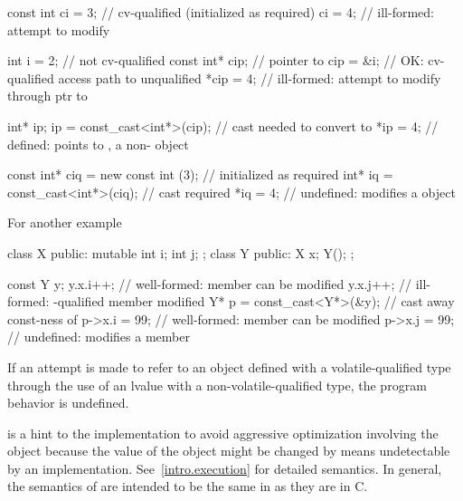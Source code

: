 \pnum
\enterexample

\begin{codeblock}
const int ci = 3;               // cv-qualified (initialized as required)
ci = 4;                         // ill-formed: attempt to modify 

int i = 2;                      // not cv-qualified
const int* cip;                 // pointer to 
cip = &i;                       // OK: cv-qualified access path to unqualified
*cip = 4;                       // ill-formed: attempt to modify through ptr to 

int* ip;
ip = const_cast<int*>(cip);     // cast needed to convert  to 
*ip = 4;                        // defined:  points to , a non- object

const int* ciq = new const int (3);     // initialized as required
int* iq = const_cast<int*>(ciq);        // cast required
*iq = 4;                                // undefined: modifies a  object
\end{codeblock}

\pnum
For another example

\begin{codeblock}
class X {
    public:
	mutable int i;
	int j;
};
class Y {
    public:
	X x;
	Y();
};

const Y y;
y.x.i++;                        // well-formed:  member can be modified
y.x.j++;                        // ill-formed: -qualified member modified
Y* p = const_cast<Y*>(&y);      // cast away const-ness of 
p->x.i = 99;                    // well-formed:  member can be modified
p->x.j = 99;                    // undefined: modifies a  member
\end{codeblock}
\exitexampleb

\pnum
If an attempt is made to refer to an object defined with a
volatile-qualified type through the use of an lvalue with a
non-volatile-qualified type, the program behavior is undefined.

\pnum
{}%
%
\enternote
{} is a hint to the implementation to avoid aggressive
optimization involving the object because the value of the object might
be changed by means undetectable by an implementation.
See~\ref{intro.execution} for detailed semantics. In general, the
semantics of  are intended to be the same in \Cpp as
they are in C.
\exitnote

